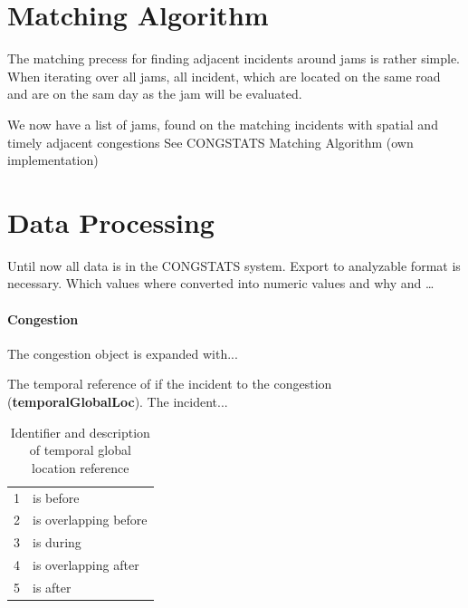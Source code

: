 \documentclass[a4paper,headsepline,footsepline,fontsize=11pt,BCOR=12mm,DIV=12]{report}
\begin{document}
\section{Matching Algorithm}
\label{methodology_matching}
The matching precess for finding adjacent incidents around jams is rather simple. When iterating over all jams, all incident, which are located on the same road and are on the sam day as the jam will be evaluated.


We now have a list of jams, found on the matching incidents with spatial and timely adjacent congestions
See CONGSTATS Matching Algorithm (own implementation)

\section{Data Processing}
\label{methodology_data_processing}
Until now all data is in the CONGSTATS system. Export to analyzable format is necessary.
Which values where converted into numeric values and why and …


\paragraph{Congestion}
The congestion object is expanded with...

The temporal reference of if the incident to the congestion (\textbf{temporalGlobalLoc}). The incident...
\noindent
\begin{table}[h!]
	\centering
	\begin{tabular}{c|l}  
		1 & is before \\ 
 		2 & is overlapping before \\ 
 		3 & is during \\
 		4 & is overlapping after \\
 		5 & is after \\
	\end{tabular}
	\caption{Identifier and description of temporal global location reference}
\end{table}
\end{document}
